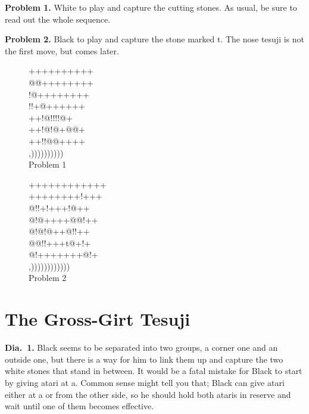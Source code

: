 \documentclass[mcrownvopaper,10pt,twopage,onecolumn,final]{memoir}
\begin{document}
\noindent
\textbf{Problem 1.} White to play and capture the cutting stones. As usual, be
sure to read out the whole sequence.

\noindent
\textbf{Problem 2.} Black to play and capture the stone marked {\gnos t}. The nose
tesuji is not the first move, but comes later.
\begin{figure}[ht]
    \begin{minipage}[c]{0.45\linewidth}
        \centering    
        {\gnos%
        ++++++++++\\
        @@++++++++\\
        !@++++++++\\
        !!+@++++++\\
        ++!@!!!!@+\\
        ++!@!@+@@+\\
        ++!!@@++++\\
        ,))))))))))\\
        }
        Problem 1
    \end{minipage}%
    \begin{minipage}[c]{0.55\linewidth}
        \centering    
        {\gnos%
        ++++++++++++\\
        ++++++++!+++\\
        @!!+!+++!@++\\
        @!@++++@@!++\\
        @!@!@++@!!++\\
        @@!!+++t@+!+\\
        @!+++++++@!+\\
        ,))))))))))))\\
        }
        Problem 2
    \end{minipage}%
\end{figure}
\section{The Gross-Girt Tesuji}

\noindent
\textbf{Dia.\ 1.} Black seems to be separated into two groups, a corner one and
an outside one, but there is a way for him to link them up and capture
the two white stones that stand in between.
It would be a fatal mistake for Black to start by giving atari at a.
Common sense might tell you that; Black can give atari either at a or
from the other side, so he should hold both ataris in reserve and wait
until one of them becomes effective.
\end{document}
